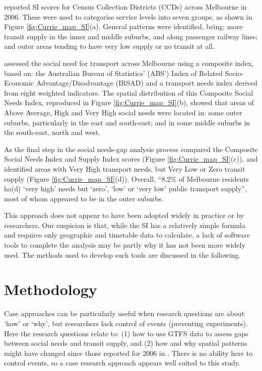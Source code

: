 \documentclass[preprint, 3p,
authoryear]{elsarticle} %
\begin{document}
\citet{currie2010identifying} reported SI scores for Census Collection
Districts (CCDs) across Melbourne in 2006. These were used to categorise
service levels into seven groups, as shown in Figure
\ref{fig:Currie_map_SI}(a). General patterns were identified, being:
more transit supply in the inner and middle suburbs, and along passenger
railway lines; and outer areas tending to have very low supply or no
transit at all.

\citet{currie2010identifying} assessed the social need for transport
across Melbourne using a composite index, based on: the Australian
Bureau of Statistics' (ABS') Index of Related Socio-Economic
Advantage/Disadvantage (IRSAD) and a transport needs index derived from
eight weighted indicators. The spatial distribution of this Composite
Social Needs Index, reproduced in Figure \ref{fig:Currie_map_SI}(b),
showed that areas of Above Average, High and Very High social needs were
located in: some outer suburbs, particularly in the east and south-east;
and in some middle suburbs in the south-east, north and west.

As the final step in the social needs-gap analysis process
\citet{currie2010identifying} compared the Composite Social Needs Index
and Supply Index scores (Figure \ref{fig:Currie_map_SI}(c)), and
identified areas with Very High transport needs, but Very Low or Zero
transit supply (Figure \ref{fig:Currie_map_SI}(d)). Overall, ``8.2\% of
Melbourne residents ha(d) `very high' needs but `zero', `low' or `very
low' public transport supply''\citep{currie2010identifying}, most of
whom appeared to be in the outer suburbs.

This approach does not appear to have been adopted widely in practice or
by researchers. Our suspicion is that, while the SI has a relatively
simple formula and requires only geographic and timetable data to
calculate, a lack of software tools to complete the analysis may be
partly why it has not been more widely used. The methods used to develop
such tools are discussed in the following.

\section{Methodology}\label{methodology}

Case approaches can be particularly useful when research questions are
about `how' or `why', but researchers lack control of events (preventing
experiments)\citep{Yin2009aa}. Here the research questions relate to:
(1) how to use GTFS data to assess gaps between social needs and transit
supply, and (2) how and why spatial patterns might have changed since
those reported for 2006 in \citet{currie2010identifying}. There is no
ability here to control events, so a case research approach appears well
suited to this study.
\end{document}
